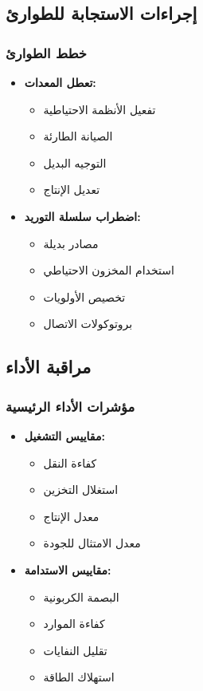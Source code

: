\subsection{إجراءات الاستجابة للطوارئ}

\subsubsection{خطط الطوارئ}
\begin{itemize}
    \item \textbf{تعطل المعدات:}
    \begin{itemize}
        \item تفعيل الأنظمة الاحتياطية
        \item الصيانة الطارئة
        \item التوجيه البديل
        \item تعديل الإنتاج
    \end{itemize}
    
    \item \textbf{اضطراب سلسلة التوريد:}
    \begin{itemize}
        \item مصادر بديلة
        \item استخدام المخزون الاحتياطي
        \item تخصيص الأولويات
        \item بروتوكولات الاتصال
    \end{itemize}
\end{itemize}

\subsection{مراقبة الأداء}

\subsubsection{مؤشرات الأداء الرئيسية}
\begin{itemize}
    \item \textbf{مقاييس التشغيل:}
    \begin{itemize}
        \item كفاءة النقل
        \item استغلال التخزين
        \item معدل الإنتاج
        \item معدل الامتثال للجودة
    \end{itemize}
    
    \item \textbf{مقاييس الاستدامة:}
    \begin{itemize}
        \item البصمة الكربونية
        \item كفاءة الموارد
        \item تقليل النفايات
        \item استهلاك الطاقة
    \end{itemize}
\end{itemize}
